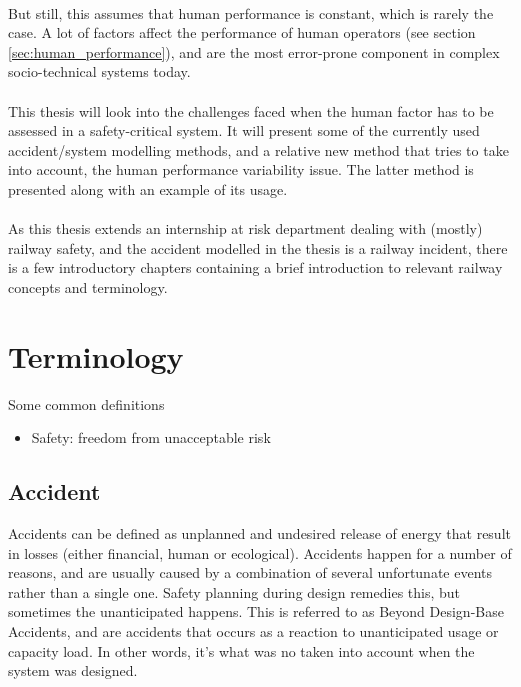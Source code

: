 \documentclass[10pt,oneside]{book}                  %
\begin{document}
\\
But still, this assumes that human performance is constant, which is rarely the case. A lot of factors affect the performance of human operators (see section \ref{sec:human_performance}), and are the most error-prone component in complex socio-technical systems today.\\
\\
This thesis will look into the challenges faced when the human factor has to be assessed in a safety-critical system. It will present some of the currently used accident/system modelling methods, and a relative new method that tries to take into account, the human performance variability issue. The latter method is presented along with an example of its usage.\\
\\
As this thesis extends an internship at risk department dealing with (mostly) railway safety, and the accident modelled in the thesis is a railway incident, there is a few introductory chapters containing a brief introduction to relevant railway concepts and terminology.

\section{Terminology}
Some common definitions
\begin{itemize}
  \item Safety: freedom from unacceptable risk
\end{itemize}
\subsection{Accident}
Accidents can be defined as unplanned and undesired release of energy that result in losses (either financial, human or ecological). Accidents happen for a number of reasons, and are usually caused by a combination of several unfortunate events rather than a single one. Safety planning during design remedies this, but sometimes the unanticipated happens. This is referred to as Beyond Design-Base Accidents, and are accidents that occurs as a reaction to unanticipated usage or capacity load. In other words, it's what was no taken into account when the system was designed.
\end{document}

